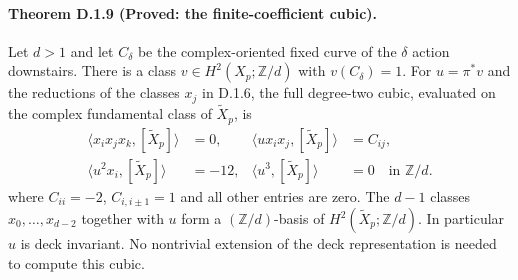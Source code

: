 \paragraph{Theorem D.1.9 (Proved: the finite-coefficient cubic).}
Let $d>1$ and let $C_\delta$ be the complex-oriented fixed curve of
the $\delta$ action downstairs. There is a class
$v\in H^2(X_p;\mathbb Z/d)$ with $v(C_\delta)=1$.
For $u=\pi^*v$ and the reductions of the classes $x_j$ in D.1.6,
the full degree-two cubic, evaluated on the complex fundamental
class of $\widetilde X_p$, is
\[
 \begin{aligned}
 \langle x_i x_j x_k,[\widetilde X_p]\rangle&=0,
 &\langle u x_i x_j,[\widetilde X_p]\rangle&=C_{ij},\\
 \langle u^2x_i,[\widetilde X_p]\rangle&=-12,
 &\langle u^3,[\widetilde X_p]\rangle&=0
 \quad\text{in }\mathbb Z/d.
 \end{aligned}
\]
where $C_{ii}=-2$, $C_{i,i\pm1}=1$ and all other entries are zero.
The $d-1$ classes $x_0,\ldots,x_{d-2}$ together with $u$ form a
$(\mathbb Z/d)$-basis of $H^2(\widetilde X_p;\mathbb Z/d)$.
In particular $u$ is deck invariant. No nontrivial extension of the
deck representation is needed to compute this cubic.
